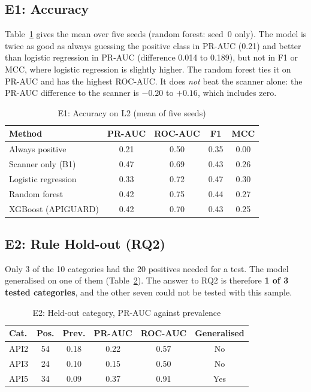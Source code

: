 \documentclass[conference]{IEEEtran}
\begin{document}
\subsection{E1: Accuracy}
Table~\ref{tab:e1} gives the mean over five seeds (random forest: seed~0 only). The model is twice as good as always guessing the positive class in PR-AUC (0.21) and better than logistic regression in PR-AUC (difference 0.014 to 0.189), but not in F1 or MCC, where logistic regression is slightly higher. The random forest ties it on PR-AUC and has the highest ROC-AUC. It does \emph{not} beat the scanner alone: the PR-AUC difference to the scanner is $-0.20$ to $+0.16$, which includes zero.

\begin{table}[!t]
\caption{E1: Accuracy on L2 (mean of five seeds)}
\label{tab:e1}
\centering
\footnotesize
\begin{tabular}{lcccc}
\toprule
\textbf{Method} & \textbf{PR-AUC} & \textbf{ROC-AUC} & \textbf{F1} & \textbf{MCC}\\
\midrule
Always positive & 0.21 & 0.50 & 0.35 & 0.00\\
Scanner only (B1) & 0.47 & 0.69 & 0.43 & 0.26\\
Logistic regression & 0.33 & 0.72 & 0.47 & 0.30\\
Random forest & 0.42 & 0.75 & 0.44 & 0.27\\
XGBoost (APIGUARD) & 0.42 & 0.70 & 0.43 & 0.25\\
\bottomrule
\end{tabular}
\end{table}

\subsection{E2: Rule Hold-out (RQ2)}
Only 3 of the 10 categories had the 20 positives needed for a test. The model generalised on one of
them (Table~\ref{tab:e2}). The answer to RQ2 is therefore \textbf{1 of 3 tested categories}, and the other
seven could not be tested with this sample.

\begin{table}[!t]
\caption{E2: Held-out category, PR-AUC against prevalence}
\label{tab:e2}
\centering
\footnotesize
\begin{tabular}{lccccc}
\toprule
\textbf{Cat.} & \textbf{Pos.} & \textbf{Prev.} & \textbf{PR-AUC} & \textbf{ROC-AUC} & \textbf{Generalised}\\
\midrule
API2 & 54 & 0.18 & 0.22 & 0.57 & No\\
API3 & 24 & 0.10 & 0.15 & 0.50 & No\\
API5 & 34 & 0.09 & 0.37 & 0.91 & Yes\\
\bottomrule
\end{tabular}
\end{table}
\end{document}
